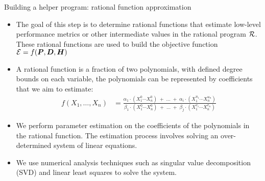 \begin{frame}[fragile]{Building a helper program: rational function approximation}
    \begin{block}{}
        \begin{itemize}
            \item The goal of this step is to determine rational functions that estimate low-level performance metrics or other intermediate values in the rational program ${\cal R}$. These rational functions are used to build the objective function ${\cal E} = f({\bm P}, {\bm D}, {\bm H})$
            \item A rational function is a fraction of two polynomials, with defined degree bounds on each variable, 
            the polynomials can be represented by coefficients that we aim to estimate: 
            {
                \small
                    \begin{align}
                    f(X_1,\dots,X_n) &= \frac{\alpha_1\cdot(X_1^0\cdots X_n^0) \;+\; 
                        \dots \;+\;  \alpha_i\cdot(X_1^{u_1}\cdots X_n^{u_n})}{\beta_1\cdot(X_1^0\cdots X_n^0) \;+\;
                        \dots \;+\; \beta_j\cdot(X_1^{v_1}\cdots X_n^{v_n})}
                    \end{align}
            }
            \item We perform parameter estimation on the coefficients of the polynomials in the rational function. 
            The estimation process involves solving an over-determined system of linear equations.
            \item We use numerical analysis techniques such as singular value decomposition (SVD) and linear least squares 
            to solve the system.
        \end{itemize}
    \end{block}
\end{frame}